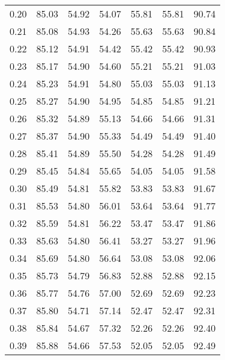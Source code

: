 \begin{tabular}{|c|c|c|c|c|c|c|}
      0.20 &     85.03 &     54.92 &      54.07 &   55.81 &      55.81 &         90.74 \\
      0.21 &     85.08 &     54.93 &      54.26 &   55.63 &      55.63 &         90.84 \\
      0.22 &     85.12 &     54.91 &      54.42 &   55.42 &      55.42 &         90.93 \\
      0.23 &     85.17 &     54.90 &      54.60 &   55.21 &      55.21 &         91.03 \\
      0.24 &     85.23 &     54.91 &      54.80 &   55.03 &      55.03 &         91.13 \\
      0.25 &     85.27 &     54.90 &      54.95 &   54.85 &      54.85 &         91.21 \\
      0.26 &     85.32 &     54.89 &      55.13 &   54.66 &      54.66 &         91.31 \\
      0.27 &     85.37 &     54.90 &      55.33 &   54.49 &      54.49 &         91.40 \\
      0.28 &     85.41 &     54.89 &      55.50 &   54.28 &      54.28 &         91.49 \\
      0.29 &     85.45 &     54.84 &      55.65 &   54.05 &      54.05 &         91.58 \\
      0.30 &     85.49 &     54.81 &      55.82 &   53.83 &      53.83 &         91.67 \\
      0.31 &     85.53 &     54.80 &      56.01 &   53.64 &      53.64 &         91.77 \\
      0.32 &     85.59 &     54.81 &      56.22 &   53.47 &      53.47 &         91.86 \\
      0.33 &     85.63 &     54.80 &      56.41 &   53.27 &      53.27 &         91.96 \\
      0.34 &     85.69 &     54.80 &      56.64 &   53.08 &      53.08 &         92.06 \\
      0.35 &     85.73 &     54.79 &      56.83 &   52.88 &      52.88 &         92.15 \\
      0.36 &     85.77 &     54.76 &      57.00 &   52.69 &      52.69 &         92.23 \\
      0.37 &     85.80 &     54.71 &      57.14 &   52.47 &      52.47 &         92.31 \\
      0.38 &     85.84 &     54.67 &      57.32 &   52.26 &      52.26 &         92.40 \\
      0.39 &     85.88 &     54.66 &      57.53 &   52.05 &      52.05 &         92.49 \\

\end{tabular}

